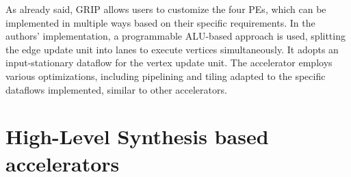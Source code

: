 As already said, GRIP allows users to customize the four PEs, which can be implemented in multiple ways based on their specific requirements.
In the authors' implementation, a programmable ALU-based approach is used, splitting the edge update unit into lanes to execute vertices simultaneously.
It adopts an input-stationary dataflow for the vertex update unit.
The accelerator employs various optimizations, including pipelining and tiling adapted to the specific dataflows implemented, similar to other accelerators.

\section{High-Level Synthesis based accelerators}
\label{sec:hls-accelerators}


